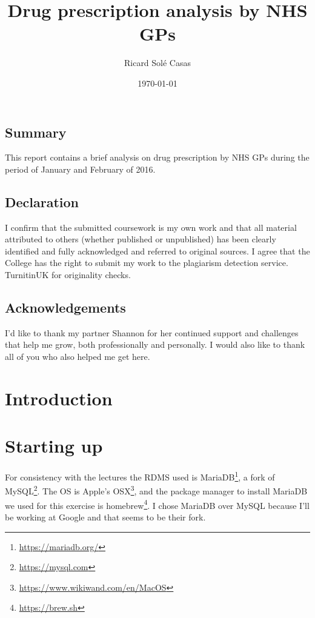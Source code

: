 \documentclass[english,a4paper,]{report}
\title{Drug prescription analysis by NHS GPs}
\author{Ricard Solé Casas}
\institute{Google UK \and Ada National College for Digital Skills}
\date{\today}
\renewcommand{\href}[2]{#2\footnote{\url{#1}}}
\begin{document}
\maketitle

\vspace*{\fill}

\section*{Summary}

This report contains a brief analysis on drug prescription by NHS GPs
during the period of January and February of 2016.

\section*{Declaration}

I confirm that the submitted coursework is my own work and that all
material attributed to others (whether published or unpublished) has
been clearly identified and fully acknowledged and referred to original
sources. I agree that the College has the right to submit my work to the
plagiarism detection service. TurnitinUK for originality checks.

\section*{Acknowledgements}

I'd like to thank my partner Shannon for her continued support and
challenges that help me grow, both professionally and personally. I
would also like to thank all of you who also helped me get here.

\vspace*{\fill}

{
\setcounter{tocdepth}{2}
\tableofcontents
}
\chapter{Introduction}\label{introduction}

\chapter{Starting up}\label{starting-up}

For consistency with the lectures the RDMS used is
\href{https://mariadb.org/}{MariaDB}, a fork of
\href{https://mysql.com}{MySQL}. The OS is Apple's
\href{https://www.wikiwand.com/en/MacOS}{OSX}, and the package manager
to install MariaDB we used for this exercise is
\href{https://brew.sh}{homebrew}. I chose MariaDB over MySQL because
I'll be working at Google and that seems to be their fork.
\end{document}
